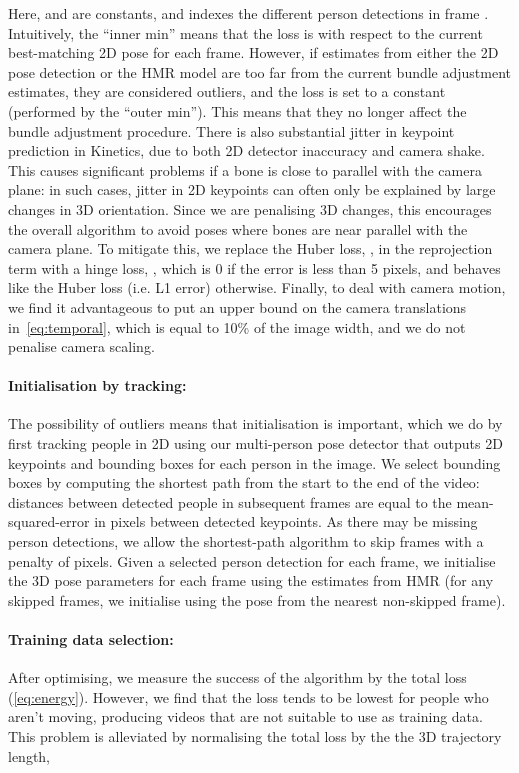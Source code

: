 \documentclass[10pt,twocolumn,letterpaper]{article}
\begin{document}
Here,  and  are constants, and  indexes the different person detections  in frame .  
Intuitively, the ``inner min'' means that the loss is with respect to the current best-matching 2D pose for each frame.  
However, if estimates from either the 2D pose detection or the HMR model are too far from the current bundle adjustment estimates, they are considered outliers, and the loss is set to a constant (performed  by the ``outer min'').
This means that they no longer affect the bundle adjustment procedure.
There is also substantial jitter in keypoint prediction in Kinetics, due to both 2D detector inaccuracy and camera shake. 
This causes significant problems if a bone is close to parallel with the camera plane: in such cases, jitter in 2D keypoints can often only be explained by large changes in 3D orientation. 
Since we are penalising 3D changes, this encourages the overall algorithm to avoid poses where bones are near parallel with the camera plane.
To mitigate this, we replace the Huber loss, , in the reprojection term with a hinge loss, , which is 0 if the error is less than 5 pixels, and behaves like the Huber loss (i.e. L1 error) otherwise.
Finally, to deal with camera motion, we find it advantageous to put an upper bound on the camera translations in~\eqref{eq:temporal}, which is equal to 10\% of the image width, and we do not penalise camera scaling.

\paragraph{Initialisation by tracking:}
The possibility of outliers means that initialisation is important, which we do by first tracking people in 2D using our multi-person pose detector \cite{papandreou_cvpr_2017} that outputs 2D keypoints and bounding boxes for each person in the image.
We select bounding boxes by computing the shortest path 
from the start to the end of the video: distances between detected people in subsequent frames are equal to the mean-squared-error in pixels between detected keypoints.
As there may be missing person detections, we allow the shortest-path algorithm to skip frames with a penalty of  pixels.
Given a selected person detection for each frame, we initialise the 3D pose parameters for each frame using the estimates from  HMR (for any skipped frames, we initialise using the pose from the nearest non-skipped frame).

\paragraph{Training data selection:}
After optimising, we measure the success of the algorithm by the total loss (\ref{eq:energy}).
However, we find that the loss tends to be lowest for people who aren't moving, producing videos that are not suitable to use as training data.
This problem is alleviated by normalising the total loss by the  the 3D trajectory length,
\end{document}
